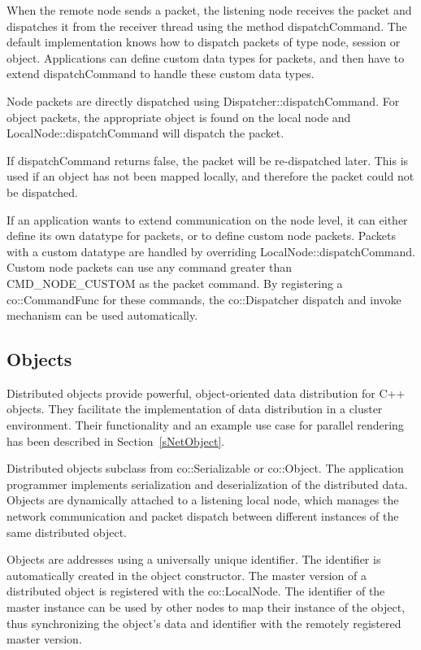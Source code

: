 \documentclass[10pt,a4]{scrartcl}
\newcommand{\sref}[1]{Section~\ref{#1}}
\begin{document}
When the remote node sends a packet, the listening node receives the
packet and dispatches it from the receiver thread using the method
\textsf{dispatchCommand}. The default implementation knows how to
dispatch packets of type node, session or object. Applications can
define custom data types for packets, and then have to extend
\textsf{dispatchCommand} to handle these custom data types.

Node packets are directly dispatched using
\textsf{Dispatcher::dispatchCommand}. For object packets, the appropriate object
is found on the local node and \textsf{LocalNode::dispatchCommand} will dispatch
the packet.

If \textsf{dispatchCommand} returns false, the packet will be
re-dispatched later. This is used if an object has not been mapped
locally, and therefore the packet could not be dispatched.

If an application wants to extend communication on the node level, it can either
define its own datatype for packets, or to define custom node packets. Packets
with a custom datatype are handled by overriding
\textsf{LocalNode::dispatchCommand}. Custom node packets can use any command
greater than \textsf{CMD\_NODE\_CUSTOM} as the packet command. By registering a
\textsf{co::CommandFunc} for these commands, the \textsf{co::Dispatcher}
dispatch and invoke mechanism can be used automatically.


\subsection{\label{sNetObject2}Objects}

Distributed objects provide powerful, object-oriented data distribution for C++
objects. They facilitate the implementation of data distribution in a cluster
environment. Their functionality and an example use case for parallel rendering
has been described in \sref{sNetObject}.

Distributed objects subclass from \textsf{co::Serializable} or
\textsf{co::Object}. The application programmer implements serialization and
deserialization of the distributed data. Objects are dynamically attached to a
listening local node, which manages the network communication and packet
dispatch between different instances of the same distributed object.

Objects are addresses using a universally unique identifier. The identifier is
automatically created in the object constructor. The master version of a
distributed object is registered with the \textsf{co::LocalNode}. The identifier
of the master instance can be used by other nodes to map their instance of the
object, thus synchronizing the object's data and identifier with the remotely
registered master version.
\end{document}
